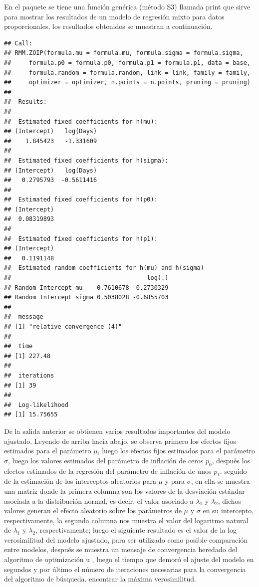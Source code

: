 En el paquete  se tiene una funci\'{o}n gen\'{e}rica (m\'{e}todo S3) llamada print que sirve para mostrar los resultados de un modelo de regresi\'{o}n mixto para datos proporcionales, los resultados obtenidos se muestran a continuaci\'{o}n.

\begin{verbatim}
## Call:
## RMM.ZOIP(formula.mu = formula.mu, formula.sigma = formula.sigma, 
##     formula.p0 = formula.p0, formula.p1 = formula.p1, data = base, 
##     formula.random = formula.random, link = link, family = family, 
##     optimizer = optimizer, n.points = n.points, pruning = pruning)
## 
##  Results: 
## 
##  Estimated fixed coefficients for h(mu): 
## (Intercept)   log(Days) 
##    1.845423   -1.331609 
## 
##  Estimated fixed coefficients for h(sigma): 
## (Intercept)   log(Days) 
##   0.2795793  -0.5611416 
## 
##  Estimated fixed coefficients for h(p0): 
## (Intercept) 
##  0.08319893 
## 
##  Estimated fixed coefficients for h(p1): 
## (Intercept) 
##   0.1191148 
##  Estimated random coefficients for h(mu) and h(sigma) 
##                                      log(.)
## Random Intercept mu    0.7610678 -0.2730329
## Random Intercept sigma 0.5038028 -0.6855703
## 
##  message 
## [1] "relative convergence (4)"
## 
##  time 
## [1] 227.48
## 
##  iterations 
## [1] 39
## 
##  Log-likelihood 
## [1] 15.75655
\end{verbatim}

De la salida anterior se obtienen varios resultados importantes del modelo ajustado. Leyendo de arriba hacia abajo, se observa primero los efectos fijos estimados para el par\'{a}metro $\mu$, luego los efectos fijos estimados para el par\'{a}metro $\sigma$, luego los valores estimados del par\'{a}metro de inflaci\'{o}n de ceros $p_0$, despu\'{e}s los efectos estimados de la regresi\'{o}n del par\'{a}metro de inflaci\'{o}n de unos $p_1$. seguido de la estimaci\'{o}n de los interceptos aleatorios para $\mu$ y para $\sigma$, en ella se muestra una matriz donde la primera columna son los valores de la desviaci\'{o}n est\'{a}ndar asociada a la distribuci\'{o}n normal, es decir, el valor asociado a $\lambda_1$ y $\lambda_2$, dichos valores generan el efecto aleatorio sobre los par\'{a}metros de $\mu$ y $\sigma$ en su intercepto, respectivamente, la segunda columna nos muestra el valor del logaritmo natural de $\lambda_1$ y $\lambda_2$, respectivamente; luego el siguiente resultado es el valor de la log verosimilitud del modelo ajustado, para ser utilizado como posible comparaci\'{o}n entre modelos, despu\'{e}s se muestra un mensaje de convergencia heredado del algoritmo de optimizaci\'{o}n  u , luego el tiempo que demor\'{o} el ajuste del modelo en segundos y por \'{u}ltimo el n\'{u}mero de iteraciones necesarias para la convergencia del algoritmo de b\'{u}squeda. encontrar la m\'{a}xima verosimilitud.\\


